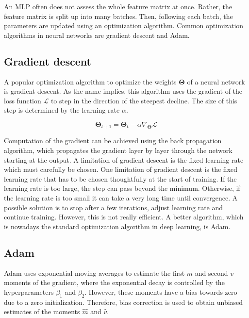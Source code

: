 An MLP often does not assess the whole feature matrix at once. Rather, the feature
matrix is split up into many batches. Then, following each batch, the parameters are
updated using an optimization algorithm. Common optimization algorithms in neural networks
are gradient descent and Adam.


\subsection{Gradient descent}


A popular optimization algorithm to optimize the weights $\pmb{\Theta}$ of a neural network is
gradient descent.\cite{ruder2016overview} As the name implies, this algorithm
uses the gradient of the loss function $\mathcal{L}$ to step in the direction of the
steepest decline. The size of this step is determined by the learning rate $\alpha$.

\begin{equation}
	\pmb{\Theta}_{t+1} = \pmb{\Theta}_{t} - \alpha \nabla_{\pmb{\Theta}} \mathcal{L}
\end{equation}

Computation of the gradient can be achieved using the back propagation algorithm, which
propagates the gradient layer by layer through the network starting at the output.
\cite{lecun1988theoretical} A limitation of gradient descent is the fixed learning
rate which must carefully be chosen. One limitation of gradient descent is the
fixed learning rate that has to be chosen thoughtfully at the start of training.
If the learning rate is too large, the step can pass beyond the minimum. Otherwise,
if the learning rate is too small it can take a very long time until convergence.
A possible solution is to stop after a few iterations, adjust learning rate and
continue training. However, this is not really efficient. A better algorithm,
which is nowadays the standard optimization algorithm in deep learning, is Adam.\cite{kingma2014adam}


\subsection{Adam}

Adam uses exponential moving averages to estimate the first $m$ and second $v$
moments of the gradient, where the exponential decay is controlled by the hyperparameters
$\beta_1$ and $\beta_2$. However, these moments have a bias towards zero due to a
zero initialization. Therefore, bias correction is used to obtain unbiased estimates
of the moments $\hat{m}$ and $\hat{v}$.\cite{kingma2014adam}


